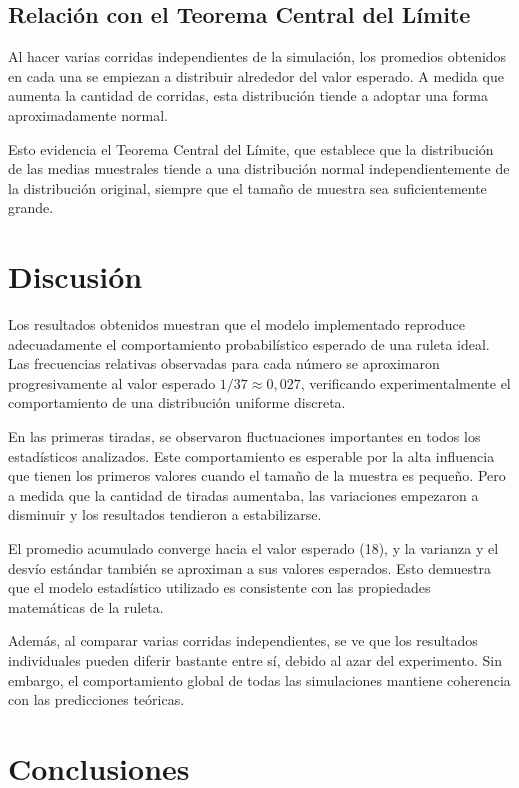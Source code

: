 \documentclass{article}
\begin{document}
\subsection{Relación con el Teorema Central del Límite}

Al hacer varias corridas independientes de la simulación, los promedios obtenidos en cada una se empiezan a distribuir alrededor 
del valor esperado. A medida que aumenta la cantidad de corridas, esta distribución tiende a adoptar una forma aproximadamente normal.

Esto evidencia el Teorema Central del Límite, que establece que la distribución de las medias muestrales tiende a una distribución 
normal independientemente de la distribución original, siempre que el tamaño de muestra sea suficientemente grande.

\section{Discusión}

Los resultados obtenidos muestran que el modelo implementado reproduce adecuadamente el comportamiento probabilístico esperado 
de una ruleta ideal. Las frecuencias relativas observadas para cada número se aproximaron progresivamente al valor esperado 
$1/37 \approx 0,027$, verificando experimentalmente el comportamiento de una distribución uniforme discreta.

En las primeras tiradas, se observaron fluctuaciones importantes en todos los estadísticos analizados. Este comportamiento es 
esperable por la alta influencia que tienen los primeros valores cuando el tamaño de la muestra es pequeño. Pero a medida que la 
cantidad de tiradas aumentaba, las variaciones empezaron a disminuir y los resultados tendieron a estabilizarse.

El promedio acumulado converge hacia el valor esperado (18), y la varianza y el desvío estándar también se aproximan a sus valores 
esperados. Esto demuestra que el modelo estadístico utilizado es consistente con las propiedades matemáticas de la ruleta.

Además, al comparar varias corridas independientes, se ve que los resultados individuales pueden diferir bastante entre sí, debido 
al azar del experimento. Sin embargo, el comportamiento global de todas las simulaciones mantiene coherencia con las predicciones teóricas.

\section{Conclusiones}
\end{document}
